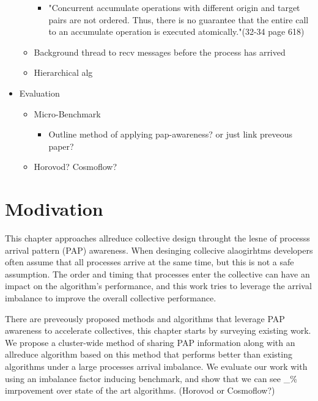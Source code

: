\begin{itemize}
\begin{itemize}
        \begin{itemize}
            \item "Concurrent accumulate operations with different origin and target pairs are
not ordered. Thus, there is no guarantee that the entire call to an accumulate operation is
executed atomically."(32-34 page 618)
        \end{itemize}
        \item Background thread to recv messages before the process has arrived 
        \item Hierarchical alg 
    \end{itemize}
    \item Evaluation
    \begin{itemize}
        \item Micro-Benchmark
            \begin{itemize}
                \item Outline method of applying pap-awareness? or just link preveous paper?
            \end{itemize}
        \item Horovod? Cosmoflow?
    \end{itemize}
\end{itemize}

\section{Modivation}

This chapter approaches allreduce collective design throught the lesne of processs arrival pattern (PAP) awareness. 
When desinging collecive alaogirhtms developers often assume that all processes arrive at the same time, but this is not a safe assumption.
The order and timing that processes enter the collective can have an impact on the algorithm's performance, and this work tries to leverage the arrival imbalance to improve the overall collective performance.

There are preveously proposed methods and algorithms that leverage PAP awareness to accelerate collectives, this chapter starts by surveying existing work.
We propose a cluster-wide method of sharing PAP information along with an allreduce algorithm based on this method that performs better than existing algorithms under a large processes arrival imbalance.
We evaluate our work with using an imbalance factor inducing benchmark, and show that we can see \_\% imrpovement over state of the art algorithms.  
(Horovod or Cosmoflow?)

